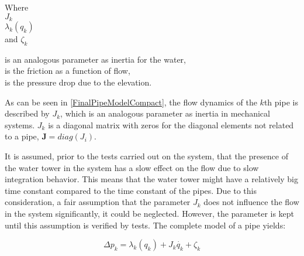  \begin{minipage}[t]{0.20\textwidth}
Where\\
\hspace*{8mm} $J_k$ \\
\hspace*{8mm} $\lambda_k(q_k)$ \\
and \hspace*{0.7mm} $\zeta_k$ 
\end{minipage}
\begin{minipage}[t]{0.68\textwidth}
\vspace*{2mm}
is an analogous parameter as inertia for the water,\\ 
is the friction as a function of flow,\\
is the pressure drop due to the elevation.
\end{minipage}

As can be seen in \eqref{FinalPipeModelCompact}, the flow dynamics of the $k$th pipe is described by $J_k$, which is an analogous parameter as inertia in mechanical systems. $J_k$ is a diagonal matrix with zeros for the diagonal elements not related to a pipe, $\pmb{J} = diag(J_i)$.

It is assumed, prior to the tests carried out on the system, that the presence of the water tower in the system has a slow effect on the flow due to slow integration behavior. This means that the water tower might have a relatively big time constant compared to the time constant of the pipes. Due to this consideration, a fair assumption that the parameter $J_k$ does not influence the flow in the system significantly, it could be neglected. However, the parameter is kept until this assumption is verified by tests. The complete model of a pipe yields: 
  
\begin{equation}
\label{FinalPipeModelSimplified}
  \Delta p_k  =   \lambda_k(q_k) + J_k \dot{q_k} + \zeta_k 
\end{equation}


